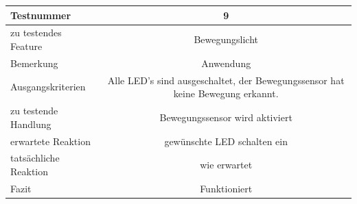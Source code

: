\documentclass[]{article}
\begin{document}
\begin{longtable}[]{@{}lc@{}}
\toprule
\begin{minipage}[b]{0.25\columnwidth}\raggedright\strut
Testnummer\strut
\end{minipage} & \begin{minipage}[b]{0.55\columnwidth}\centering\strut
9\strut
\end{minipage}\tabularnewline
\midrule
\endhead
\begin{minipage}[t]{0.25\columnwidth}\raggedright\strut
zu testendes Feature\strut
\end{minipage} & \begin{minipage}[t]{0.55\columnwidth}\centering\strut
Bewegungslicht\strut
\end{minipage}\tabularnewline
\begin{minipage}[t]{0.25\columnwidth}\raggedright\strut
Bemerkung\strut
\end{minipage} & \begin{minipage}[t]{0.55\columnwidth}\centering\strut
Anwendung\strut
\end{minipage}\tabularnewline
\begin{minipage}[t]{0.25\columnwidth}\raggedright\strut
Ausgangskriterien\strut
\end{minipage} & \begin{minipage}[t]{0.55\columnwidth}\centering\strut
Alle LED's sind ausgeschaltet, der Bewegungssensor hat keine Bewegung
erkannt.\strut
\end{minipage}\tabularnewline
\begin{minipage}[t]{0.25\columnwidth}\raggedright\strut
zu testende Handlung\strut
\end{minipage} & \begin{minipage}[t]{0.55\columnwidth}\centering\strut
Bewegungssensor wird aktiviert\strut
\end{minipage}\tabularnewline
\begin{minipage}[t]{0.25\columnwidth}\raggedright\strut
erwartete Reaktion\strut
\end{minipage} & \begin{minipage}[t]{0.55\columnwidth}\centering\strut
gewünschte LED schalten ein\strut
\end{minipage}\tabularnewline
\begin{minipage}[t]{0.25\columnwidth}\raggedright\strut
tatsächliche Reaktion\strut
\end{minipage} & \begin{minipage}[t]{0.55\columnwidth}\centering\strut
wie erwartet\strut
\end{minipage}\tabularnewline
\begin{minipage}[t]{0.25\columnwidth}\raggedright\strut
Fazit\strut
\end{minipage} & \begin{minipage}[t]{0.55\columnwidth}\centering\strut
Funktioniert\strut
\end{minipage}\tabularnewline
\bottomrule
\end{longtable}
\end{document}
